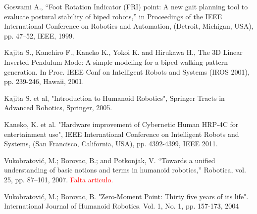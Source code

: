 \begin{thebibliography}{X}


 Goswami A., “Foot Rotation Indicator (FRI) point: A new gait planning tool to evaluate postural stability of biped robots,” in Proceedings of the IEEE International Conference on Robotics and Automation, (Detroit, Michigan, USA), pp. 47–52, IEEE, 1999.

 Kajita S., Kanehiro F., Kaneko K., Yokoi K. and Hirukawa H., The 3D Linear Inverted Pendulum Mode: A simple modeling for a biped walking pattern generation. In Proc. IEEE Conf on Intelligent Robots and Systems (IROS 2001), pp. 239-246, Hawaii, 2001. 

 Kajita S. et al, "Introduction to Humanoid Robotics", Springer Tracts in Advanced Robotics, Springer, 2005.

 Kaneko, K. et al. "Hardware improvement of Cybernetic Human HRP-4C for entertainment use", IEEE International Conference on Intelligent Robots and Systems, (San Francisco, California, USA), pp. 4392-4399, IEEE 2011.

 Vukobratović, M.; Borovac, B.; and Potkonjak, V. “Towards a unified understanding of basic notions and terms in humanoid robotics,” Robotica, vol. 25, pp. 87–101, 2007. \textcolor{red}{Falta articulo.}

 Vukobratović, M.; Borovac, B. "Zero-Moment Point: Thirty five years of its life". International Journal of Humanoid Robotics. Vol. 1, No. 1, pp. 157-173, 2004
\end{thebibliography}
